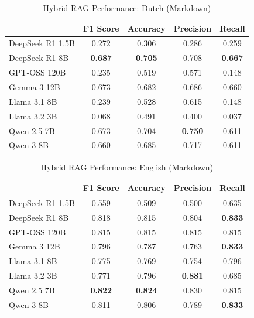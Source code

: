 
\begin{table}[!htbp]
\caption{Hybrid RAG Performance: Dutch (Markdown)}
\label{tab:hybrid_dutch_md}
\begin{tabular}{lcccc}
\toprule
 & F1 Score & Accuracy & Precision & Recall \\
\midrule
DeepSeek R1 1.5B & 0.272 & 0.306 & 0.286 & 0.259 \\
DeepSeek R1 8B & \textbf{0.687} & \textbf{0.705} & 0.708 & \textbf{0.667} \\
GPT-OSS 120B & 0.235 & 0.519 & 0.571 & 0.148 \\
Gemma 3 12B & 0.673 & 0.682 & 0.686 & 0.660 \\
Llama 3.1 8B & 0.239 & 0.528 & 0.615 & 0.148 \\
Llama 3.2 3B & 0.068 & 0.491 & 0.400 & 0.037 \\
Qwen 2.5 7B & 0.673 & 0.704 & \textbf{0.750} & 0.611 \\
Qwen 3 8B & 0.660 & 0.685 & 0.717 & 0.611 \\
\bottomrule
\end{tabular}
\end{table}


\begin{table}[!htbp]
\caption{Hybrid RAG Performance: English (Markdown)}
\label{tab:hybrid_english_md}
\begin{tabular}{lcccc}
\toprule
 & F1 Score & Accuracy & Precision & Recall \\
\midrule
DeepSeek R1 1.5B & 0.559 & 0.509 & 0.500 & 0.635 \\
DeepSeek R1 8B & 0.818 & 0.815 & 0.804 & \textbf{0.833} \\
GPT-OSS 120B & 0.815 & 0.815 & 0.815 & 0.815 \\
Gemma 3 12B & 0.796 & 0.787 & 0.763 & \textbf{0.833} \\
Llama 3.1 8B & 0.775 & 0.769 & 0.754 & 0.796 \\
Llama 3.2 3B & 0.771 & 0.796 & \textbf{0.881} & 0.685 \\
Qwen 2.5 7B & \textbf{0.822} & \textbf{0.824} & 0.830 & 0.815 \\
Qwen 3 8B & 0.811 & 0.806 & 0.789 & \textbf{0.833} \\
\bottomrule
\end{tabular}
\end{table}



